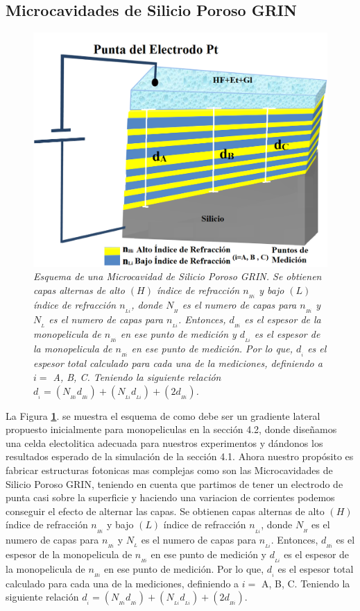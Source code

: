\documentclass[a4paper,11pt,]{book}
\begin{document}
\subsection{Microcavidades de Silicio Poroso GRIN}
\begin{figure}[H]
	\centering
	\includegraphics[scale=0.2]{../Images/MicrGrin}
	\caption{\emph{ Esquema de una Microcavidad de Silicio Poroso GRIN.  Se obtienen capas alternas de alto $(H)$ índice de refracción $n_{_{Hi}}$ y bajo $(L)$ índice de refracción  $n_{_{Li}}$, donde $N_{_{H}}$ es el numero de capas para  $n_{_{Hi}}$ y $N_{_{L}}$ es el numero de capas para  $n_{_{Li}}$. Entonces, $d_{_{Hi}}$ es el espesor de la monopelicula de  $n_{_{Hi}}$ en ese punto de medición y $d_{_{Li}}$ es el espesor de la monopelicula de  $n_{_{Hi}}$ en ese punto de medición. Por lo que, $d_{_{i}}$ es el espesor total calculado para cada una de la mediciones, definiendo a $i=$ A, B, C. Teniendo la siguiente relación $d_{_{i}} = (N_{_{Hi}}d_{_{Hi}})+(N_{_{Li}}d_{_{Li}}) + (2d_{_{Hi}})$. }}
	\label{fig:MCGRIN0}
\end{figure}
La Figura\textbf{ \ref{fig:MCGRIN0}}. se muestra el esquema de como debe ser un gradiente lateral propuesto inicialmente para monopeliculas en la sección 4.2, donde diseñamos una celda electolitica adecuada para nuestros experimentos y dándonos los resultados esperado de la simulación de la sección 4.1. Ahora nuestro propósito es fabricar estructuras fotonicas mas complejas como son las Microcavidades  de Silicio Poroso GRIN, teniendo en cuenta que partimos de tener un electrodo de punta casi sobre la superficie y haciendo una variacion de corrientes podemos conseguir el efecto de alternar las capas.  Se obtienen capas alternas de alto $(H)$ índice de refracción $n_{_{Hi}}$ y bajo $(L)$ índice de refracción  $n_{_{Li}}$, donde $N_{_{H}}$ es el numero de capas para  $n_{_{Hi}}$ y $N_{_{L}}$ es el numero de capas para  $n_{_{Li}}$. Entonces, $d_{_{Hi}}$ es el espesor de la monopelicula de  $n_{_{Hi}}$ en ese punto de medición y $d_{_{Li}}$ es el espesor de la monopelicula de  $n_{_{Hi}}$ en ese punto de medición. Por lo que, $d_{_{i}}$ es el espesor total calculado para cada una de la mediciones, definiendo a $i=$ A, B, C. Teniendo la siguiente relación $d_{_{i}} = (N_{_{Hi}}d_{_{Hi}})+(N_{_{Li}}d_{_{Li}}) + (2d_{_{Hi}})$.
\end{document}
